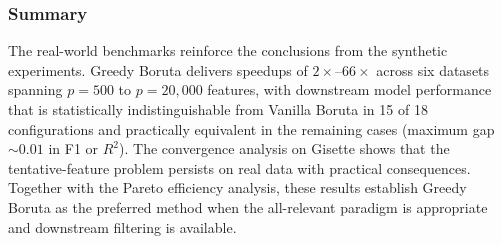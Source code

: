 \documentclass[runningheads]{llncs}
\newcommand{\writeme}[1]{\todo[inline,color=yellow!40]{WRITE: #1}}
\begin{document}
\subsubsection{Summary}
\label{sec:experiments:realworld:summary}
 
The real-world benchmarks reinforce the conclusions from the synthetic experiments. Greedy Boruta delivers speedups of $2\times$--$66\times$ across six datasets spanning $p = 500$ to $p = 20{,}000$ features, with downstream model performance that is statistically indistinguishable from Vanilla Boruta in 15 of 18 configurations and practically equivalent in the remaining cases (maximum gap ${\sim}0.01$ in F1 or $R^2$). 
The convergence analysis on Gisette shows that the tentative-feature problem persists on real data with practical consequences.
Together with the Pareto efficiency analysis, these results establish Greedy Boruta as the preferred method when the all-relevant paradigm is appropriate and downstream filtering is available.



\end{document}
